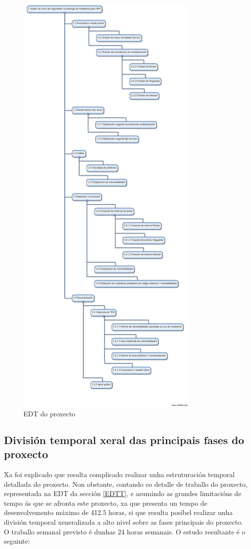 \begin{figure}
\centerline{\includegraphics[width=9cm]{figuras/EDTT.png}}
\caption{\gls{EDT} do proxecto}
\label{EDTTFigura}
\end{figure}

\subsection{División temporal xeral das principais fases do proxecto}
\label{divisionTemporalXeral}

Xa foi explicado que resulta complicado realizar unha estruturación temporal detallada do proxecto. Non obstante, contando co detalle de traballo do proxecto, representada na \gls{EDT} da sección \ref{EDTT}, e asumindo as grandes limitacións de tempo ás que se afronta este proxecto, xa que presenta un tempo de desenvolvemento máximo de 412.5 horas, si que resulta posíbel realizar unha división temporal xeneralizada a alto nivel sobre as fases principais do proxecto. O traballo semanal previsto é dunhas 24 horas semanais. O estudo resultante é o seguinte:


